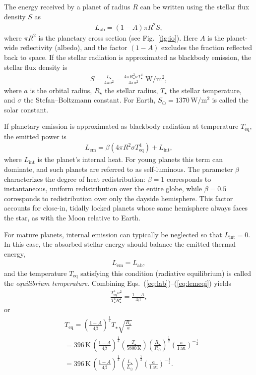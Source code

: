 The energy received by a planet of radius $R$ can be written using the stellar flux density $S$ as
\begin{align}
\label{eq:lab}
L_{\mathrm{ab}}=(1-A) \pi R^2 S,
\end{align}
where $\pi R^2$ is the planetary cross section (see Fig.~\ref{fig:io}). Here $A$ is the planet-wide reflectivity (albedo), and the factor $(1-A)$ excludes the fraction reflected back to space. If the stellar radiation is approximated as blackbody emission, the stellar flux density is
\begin{align}
\label{eq:starfluxdens}
S= \frac{L_\star}{4 \pi a^2} = \frac{4 \pi R_\star^2 \sigma T_\star^4}{4 \pi a^2}\,\,\mathrm{W/m^2},
\end{align}
where $a$ is the orbital radius, $R_\star$ the stellar radius, $T_\star$ the stellar temperature, and $\sigma$ the Stefan--Boltzmann constant. For Earth, $S_\odot =1370 \,\mathrm{W/m^2}$ is called the solar constant.

If planetary emission is approximated as blackbody radiation at temperature $T_{\mathrm{eq}}$, the emitted power is
\begin{align}
\label{eq:lem}
L_{\mathrm{em}} = \beta \left( 4 \pi R^2 \sigma T_{\mathrm{eq}}^4 \right) + L_\mathrm{int},
\end{align}
where $L_\mathrm{int}$ is the planet's internal heat. For young planets this term can dominate, and such planets are referred to as self-luminous. The parameter $\beta$ characterizes the degree of heat redistribution: $\beta=1$ corresponds to instantaneous, uniform redistribution over the entire globe, while $\beta=0.5$ corresponds to redistribution over only the dayside hemisphere. This factor accounts for close-in, tidally locked planets whose same hemisphere always faces the star, as with the Moon relative to Earth.

For mature planets, internal emission can typically be neglected so that $L_\mathrm{int}=0$. In this case, the absorbed stellar energy should balance the emitted thermal energy,
\begin{align}
\label{eq:lemeqi}
L_{\mathrm{em}} = L_{\mathrm{ab}},
\end{align}
and the temperature $T_{\mathrm{eq}}$ satisfying this condition (radiative equilibrium) is called the \emph{equilibrium temperature}. Combining Eqs.~(\ref{eq:lab})--(\ref{eq:lemeqi}) yields
\begin{align}
\label{eq:eqteq}
\frac{T_{\mathrm{eq}}^4 a^2 }{T_\star^4 R_\star^2} = \frac{1-A}{4 \beta},
\end{align}
or
\begin{align}
&T_\mathrm{eq} = \left(\frac{1-A}{4 \beta}\right)^{\frac{1}{4}} T_\star \sqrt{\frac{R_\star}{a}} \\
&= 396 \,\mathrm{K}\, \left(\frac{1-A}{4 \beta}\right)^{\frac{1}{4}} \left( \frac{T_\star}{5800 \,\mathrm{K}}\right) \left( \frac{R_\star}{R_\odot}\right)^{\frac{1}{2}} \left( \frac{a}{1 \,\mathrm{au}}\right)^{-\frac{1}{2}} \\
&= 396 \,\mathrm{K}\, \left(\frac{1-A}{4 \beta}\right)^{\frac{1}{4}} \left( \frac{L_\star}{L_\odot}\right)^{\frac{1}{4}} \left( \frac{a}{1 \,\mathrm{au}}\right)^{-\frac{1}{2}}.
\end{align}


